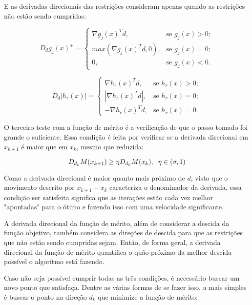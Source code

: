 E as derivadas direcionais das restrições consideram apenas quando as restrições não estão sendo
cumpridas:

\begin{equation}
  D_dg_j(x)^+ = \begin{cases}
    \nabla g_j(x)^Td,         & \text{se } g_j(x) > 0;\\
    max(\nabla g_j(x)^Td, 0), & \text{se } g_j(x) = 0;\\
    0,                       & \text{se } g_j(x) < 0.
  \end{cases}
\end{equation}


\begin{equation}
  D_d|h_r(x)| = \begin{cases}
    \nabla h_r(x)^Td,         & \text{se } h_r(x) > 0;\\
    |\nabla h_r(x)^Td|,       & \text{se } h_r(x) = 0;\\
    -\nabla h_r(x)^Td,        & \text{se } h_r(x) = 0.
  \end{cases}
\end{equation}

O terceiro teste com a função de mérito é a verificação de que o passo tomado foi grande o
suficiente. Essa condição é feita por verificar se a derivada direcional em \(x_{k+1}\) é
maior que em \(x_k\), mesmo que reduzida:

\begin{equation}
  D_{d_k} M(x_{k+1}) \geq \eta D_{d_k} M(x_k), \hspace{0.2cm} \eta \in (\sigma, 1)
\end{equation}


Como a derivada direcional é maior quanto mais próximo de \(d\), visto que o movimento descrito
por \(x_{k+1} - x_k\) caracteriza o denominador da derivada, essa condição ser satisfeita
significa que as iterações estão cada vez melhor "apontadas" para o ótimo e fazendo isso
com uma velocidade significante.

A derivada direcional da função de mérito, além de considerar a descida da função objetivo,
também considera as direções de descida para que as restrições que não estão sendo cumpridas
sejam. Então, de forma geral, a derivada direcional da função de mérito quantifica o quão
próximo da melhor descida possível o algoritmo está fazendo.

Caso não seja possível cumprir todas as três condições, é necessário buscar um novo ponto
que satisfaça. Dentre as várias formas de se fazer isso, a mais simples é buscar o ponto
na direção \(d_k\) que minimize a função de mérito:

